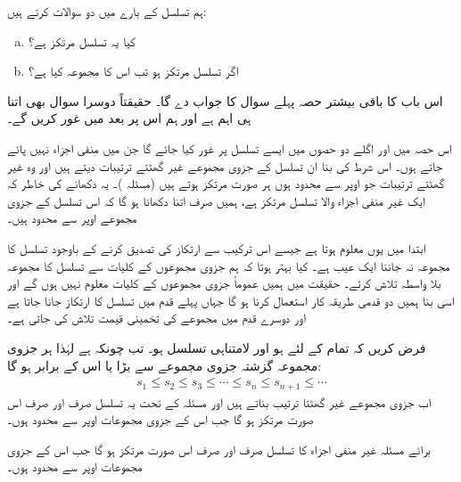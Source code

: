 ہم تسلسل  کے بارے میں دو سوالات کرتے ہیں:
\begin{enumerate}[a.]
\item
کیا یہ تسلسل مرتکز ہے؟
\item
اگر تسلسل مرتکز ہو تب اس کا مجموعہ کیا ہے؟
\end{enumerate}

اس باب کا باقی بیشتر حصہ پہلے سوال کا جواب دے گا۔ حقیقتاً دوسرا سوال بھی اتنا ہی اہم ہے اور ہم اس پر بعد میں غور کریں گے۔

اس حصہ میں اور اگلے دو حصوں میں ایسے تسلسل پر غور کیا جائے گا جن میں منفی اجزاء نہیں پائے جاتے ہوں۔ اس شرط کی بنا ان تسلسل کے جزوی مجموعے غیر گھٹتے ترتیبات دیتے ہیں اور وہ غیر گھٹتے ترتیبات جو  اوپر سے محدود ہوں ہر صورت مرتکز ہوتے ہیں (مسئلہ )۔ یہ دکھانے کی خاطر کہ ایک غیر منفی اجزاء والا تسلسل مرتکز ہے، ہمیں صرف اتنا دکھانا ہو گا کہ اس تسلسل کے جزوی مجموعے اوپر سے محدود ہیں۔

ابتدا میں یوں معلوم ہوتا ہے جیسے اس ترکیب سے ارتکاز کی تصدیق کرنے کے باوجود تسلسل کا مجموعہ نہ جاننا ایک عیب ہے۔ کیا بہتر ہوتا کہ ہم جزوی مجموعوں کے کلیات سے تسلسل کا مجموعہ بلا واسطہ تلاش کرتے۔ حقیقت میں ہمیں عموماً جزوی مجموعوں کے کلیات معلوم نہیں ہوں گے  اور اسی بنا ہمیں دو قدمی طریقہ کار استعمال کرنا ہو گا جہاں پہلے قدم میں تسلسل کا ارتکاز جانا جاتا ہے اور دوسرے قدم میں مجموعے کی تخمینی قیمت تلاش کی جاتی ہے۔ 

فرض کریں کہ تمام  کے لئے  ہو اور  لامتناہی تسلسل ہو۔
 تب چونکہ  ہے لہٰذا ہر جزوی مجموعہ گزشتہ جزوی مجموعے سے بڑا یا اس کے برابر ہو گا:
\begin{align*}
s_1\le s_2\le s_3\le \cdots\le s_n\le s_{n+1}\le \cdots
\end{align*}
اب جزوی مجموعے غیر گھٹتا ترتیب بناتے ہیں اور مسئلہ  کے تحت یہ تسلسل صرف اور صرف اس صورت مرتکز ہو گا جب اس کے جزوی مجموعات اوپر سے محدود ہوں۔

 برائے مسئلہ 
غیر منفی اجزاء کا تسلسل  صرف اور صرف اس صورت مرتکز ہو گا جب اس کے جزوی مجموعات اوپر سے محدود ہوں۔

